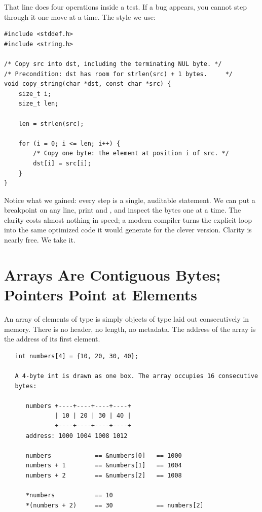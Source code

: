 That line does four operations inside a test. If a bug appears, you
cannot step through it one move at a time. The style we use:

\begin{lstlisting}[caption={Our explicit style: one move per line, named pointers.}]
#include <stddef.h>
#include <string.h>

/* Copy src into dst, including the terminating NUL byte. */
/* Precondition: dst has room for strlen(src) + 1 bytes.     */
void copy_string(char *dst, const char *src) {
    size_t i;
    size_t len;

    len = strlen(src);

    for (i = 0; i <= len; i++) {
        /* Copy one byte: the element at position i of src. */
        dst[i] = src[i];
    }
}
\end{lstlisting}

Notice what we gained: every step is a single, auditable statement.
We can put a breakpoint on any line, print  and ,
and inspect the bytes one at a time. The clarity costs almost nothing
in speed; a modern compiler turns the explicit loop into the same
optimized code it would generate for the clever version. Clarity is
nearly free. We take it.

\section{Arrays Are Contiguous Bytes; Pointers Point at Elements}

An array of  elements of type  is simply 
objects of type  laid out consecutively in memory. There is no
header, no length, no metadata. The address of the array is the address
of its first element.

\begin{verbatim}
   int numbers[4] = {10, 20, 30, 40};

   A 4-byte int is drawn as one box. The array occupies 16 consecutive
   bytes:

      numbers +----+----+----+----+
              | 10 | 20 | 30 | 40 |
              +----+----+----+----+
      address: 1000 1004 1008 1012

      numbers            == &numbers[0]   == 1000
      numbers + 1        == &numbers[1]   == 1004
      numbers + 2        == &numbers[2]   == 1008

      *numbers           == 10
      *(numbers + 2)     == 30            == numbers[2]
\end{verbatim}

